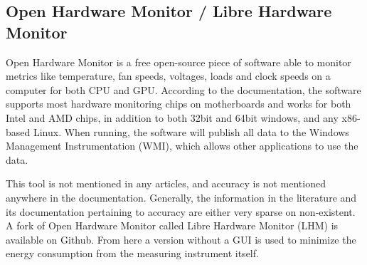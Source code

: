 \subsection{Open Hardware Monitor / Libre Hardware Monitor}

Open Hardware Monitor is a free open-source piece of software able to monitor metrics like temperature, fan speeds, voltages, loads and clock speeds on a computer for both CPU and GPU. According to the documentation, the software supports most hardware monitoring chips on motherboards and works for both Intel and AMD chips, in addition to both 32bit and 64bit windows, and any x86-based Linux. When running, the software will publish all data to the Windows Management Instrumentation (WMI), which allows other applications to use the data.\cite[]{open_hardware_monitor}

This tool is not mentioned in any articles, and accuracy is not mentioned anywhere in the documentation. Generally, the information in the literature and its documentation pertaining to accuracy are either very sparse on non-existent. A fork of Open Hardware Monitor called Libre Hardware Monitor (LHM) is available on Github\cite*{libre_hardware_monitor}. From here a version without a GUI is used to minimize the energy consumption from the measuring instrument itself.